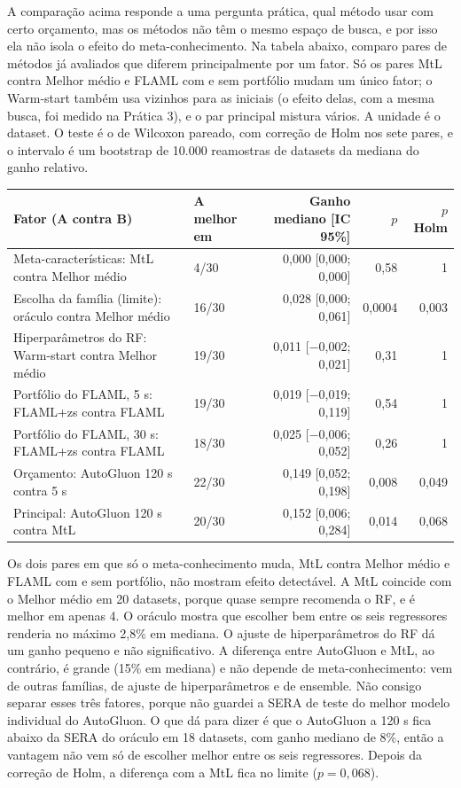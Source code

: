 \documentclass[10pt,a4paper]{article}
\begin{document}
A comparação acima responde a uma pergunta prática, qual método usar com certo orçamento, mas os métodos não têm o mesmo espaço de busca, e por isso ela não isola o efeito do meta-conhecimento. Na tabela abaixo, comparo pares de métodos já avaliados que diferem principalmente por um fator. Só os pares MtL contra Melhor médio e FLAML com e sem portfólio mudam um único fator; o Warm-start também usa vizinhos para as iniciais (o efeito delas, com a mesma busca, foi medido na Prática 3), e o par principal mistura vários. A unidade é o dataset. O teste é o de Wilcoxon pareado, com correção de Holm nos sete pares, e o intervalo é um bootstrap de 10.000 reamostras de datasets da mediana do ganho relativo.

\begin{center}\small
\begin{tabularx}{\linewidth}{Ylrrr}
\toprule
Fator (A contra B) & A melhor em & Ganho mediano [IC 95\%] & $p$ & $p$ Holm \\
\midrule
Meta-características: MtL contra Melhor médio & 4/30 & 0,000 [0,000; 0,000] & 0,58 & 1 \\
Escolha da família (limite): oráculo contra Melhor médio & 16/30 & 0,028 [0,000; 0,061] & 0,0004 & 0,003 \\
Hiperparâmetros do RF: Warm-start contra Melhor médio & 19/30 & 0,011 [$-$0,002; 0,021] & 0,31 & 1 \\
Portfólio do FLAML, 5 s: FLAML+zs contra FLAML & 19/30 & 0,019 [$-$0,019; 0,119] & 0,54 & 1 \\
Portfólio do FLAML, 30 s: FLAML+zs contra FLAML & 18/30 & 0,025 [$-$0,006; 0,052] & 0,26 & 1 \\
Orçamento: AutoGluon 120 s contra 5 s & 22/30 & 0,149 [0,052; 0,198] & 0,008 & 0,049 \\
Principal: AutoGluon 120 s contra MtL & 20/30 & 0,152 [0,006; 0,284] & 0,014 & 0,068 \\
\bottomrule
\end{tabularx}
\end{center}

Os dois pares em que só o meta-conhecimento muda, MtL contra Melhor médio e FLAML com e sem portfólio, não mostram efeito detectável. A MtL coincide com o Melhor médio em 20 datasets, porque quase sempre recomenda o RF, e é melhor em apenas 4. O oráculo mostra que escolher bem entre os seis regressores renderia no máximo 2,8\% em mediana. O ajuste de hiperparâmetros do RF dá um ganho pequeno e não significativo. A diferença entre AutoGluon e MtL, ao contrário, é grande (15\% em mediana) e não depende de meta-conhecimento: vem de outras famílias, de ajuste de hiperparâmetros e de ensemble. Não consigo separar esses três fatores, porque não guardei a SERA de teste do melhor modelo individual do AutoGluon. O que dá para dizer é que o AutoGluon a 120 s fica abaixo da SERA do oráculo em 18 datasets, com ganho mediano de 8\%, então a vantagem não vem só de escolher melhor entre os seis regressores. Depois da correção de Holm, a diferença com a MtL fica no limite ($p=0{,}068$).
\end{document}
